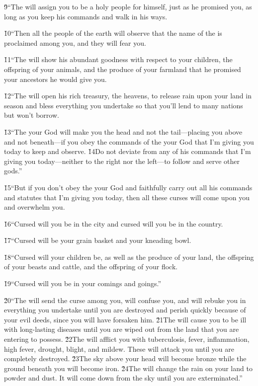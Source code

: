 \v{9}``The  will assign you to be a holy people for himself, just as he promised you, as long as you keep his commands and walk in his ways.

\v{10}``Then all the people of the earth will observe that the name of the  is proclaimed among you, and they will fear you.

\v{11}``The  will show his abundant goodness with respect to your children, the offspring of your animals, and the produce of your farmland that he promised your ancestors he would give you.

\v{12}``The  will open his rich treasury, the heavens, to release rain upon your land in season and bless everything you undertake so that you'll lend to many nations but won't borrow.

\v{13}``The  your God will make you the head and not the tail---placing you above and not beneath---if you obey the commands of the  your God that I'm giving you today to keep and observe. \v{14}Do not deviate from any of his commands that I'm giving you today---neither to the right nor the left---to follow and serve other gods.''

\v{15}``But if you don't obey the  your God and faithfully carry out all his commands and statutes that I'm giving you today, then all these curses will come upon you and overwhelm you.

\v{16}``Cursed will you be in the city and cursed will you be in the country.

\v{17}``Cursed will be your grain basket and your kneading bowl.

\v{18}``Cursed will your children be, as well as the produce of your land, the offspring of your beasts and cattle, and the offspring of your flock.

\v{19}``Cursed will you be in your comings and goings.''

\v{20}``The  will send the curse among you, will confuse you, and will rebuke you in everything you undertake until you are destroyed and perish quickly because of your evil deeds, since you will have forsaken him. \v{21}The  will cause you to be ill with long-lasting diseases until you are wiped out from the land that you are entering to possess. \v{22}The  will afflict you with tuberculosis, fever, inflammation, high fever, drought, blight, and mildew. These will attack you until you are completely destroyed. \v{23}The sky above your head will become bronze while the ground beneath you will become iron. \v{24}The  will change the rain on your land to powder and dust. It will come down from the sky until you are exterminated.''

